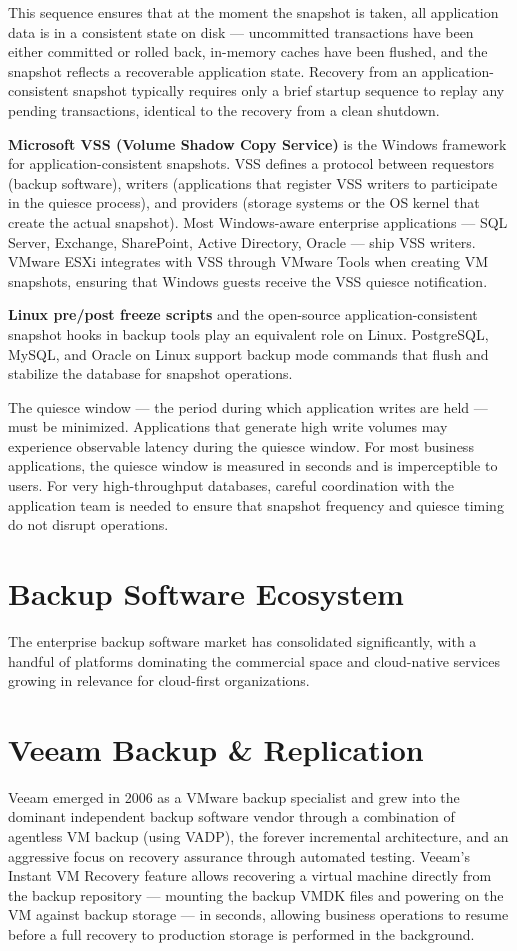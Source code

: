 This sequence ensures that at the moment the snapshot is taken, all application data is in a consistent state on disk --- uncommitted transactions have been either committed or rolled back, in-memory caches have been flushed, and the snapshot reflects a recoverable application state. Recovery from an application-consistent snapshot typically requires only a brief startup sequence to replay any pending transactions, identical to the recovery from a clean shutdown.

\textbf{Microsoft VSS (Volume Shadow Copy Service)} is the Windows framework for application-consistent snapshots. VSS defines a protocol between requestors (backup software), writers (applications that register VSS writers to participate in the quiesce process), and providers (storage systems or the OS kernel that create the actual snapshot). Most Windows-aware enterprise applications --- SQL Server, Exchange, SharePoint, Active Directory, Oracle --- ship VSS writers. VMware ESXi integrates with VSS through VMware Tools when creating VM snapshots, ensuring that Windows guests receive the VSS quiesce notification.

\textbf{Linux pre/post freeze scripts} and the open-source application-consistent snapshot hooks in backup tools play an equivalent role on Linux. PostgreSQL, MySQL, and Oracle on Linux support backup mode commands that flush and stabilize the database for snapshot operations.

The quiesce window --- the period during which application writes are held --- must be minimized. Applications that generate high write volumes may experience observable latency during the quiesce window. For most business applications, the quiesce window is measured in seconds and is imperceptible to users. For very high-throughput databases, careful coordination with the application team is needed to ensure that snapshot frequency and quiesce timing do not disrupt operations.

\section{Backup Software Ecosystem}
The enterprise backup software market has consolidated significantly, with a handful of platforms dominating the commercial space and cloud-native services growing in relevance for cloud-first organizations.

\section{Veeam Backup \& Replication}
Veeam emerged in 2006 as a VMware backup specialist and grew into the dominant independent backup software vendor through a combination of agentless VM backup (using VADP), the forever incremental architecture, and an aggressive focus on recovery assurance through automated testing. Veeam's Instant VM Recovery feature allows recovering a virtual machine directly from the backup repository --- mounting the backup VMDK files and powering on the VM against backup storage --- in seconds, allowing business operations to resume before a full recovery to production storage is performed in the background.

